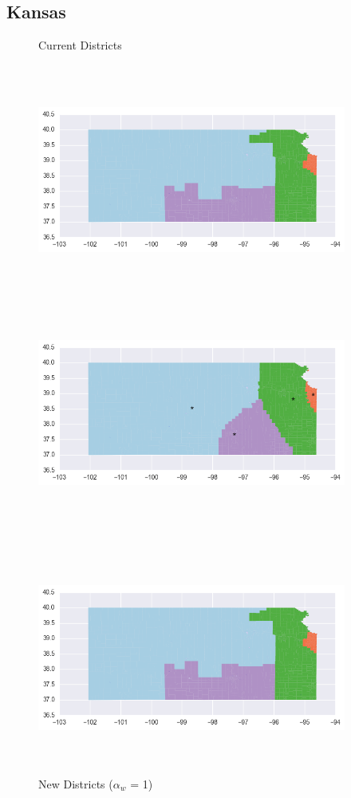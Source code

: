 \clearpage
\newpage

\subsection{Kansas}
\begin{figure}[htb!] \centering
\caption{ Current Districts }
\includegraphics[width=4in,height=3in,keepaspectratio]{../maps/KS/static/before.png}
\includegraphics[width=4in,height=3in,keepaspectratio]{../maps/KS/static/0_0_after.png}
\caption{ New Districts ($\alpha_w$ = 1) }
\includegraphics[width=4in,height=3in,keepaspectratio]{../maps/KS/static/before.png}

\end{figure}
